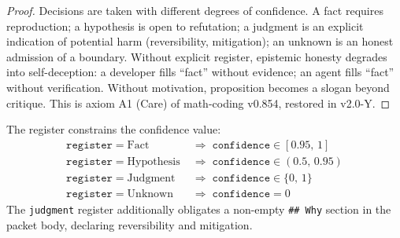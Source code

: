 \begin{proof}
Decisions are taken with different degrees of confidence. A fact
requires reproduction; a hypothesis is open to refutation; a judgment
is an explicit indication of potential harm (reversibility,
mitigation); an unknown is an honest admission of a boundary. Without
explicit register, epistemic honesty degrades into self-deception:
a developer fills ``fact'' without evidence; an agent fills
``fact'' without verification. Without motivation, proposition
becomes a slogan beyond critique. This is axiom A1 (Care) of
math-coding v0.854, restored in v2.0-Y.
\end{proof}

\begin{theorem}
The register constrains the confidence value:
\begin{align*}
\mathtt{register} = \mathrm{Fact}       &\;\Rightarrow\; \mathtt{confidence} \in [0.95,\, 1] \\
\mathtt{register} = \mathrm{Hypothesis} &\;\Rightarrow\; \mathtt{confidence} \in (0.5,\, 0.95) \\
\mathtt{register} = \mathrm{Judgment}   &\;\Rightarrow\; \mathtt{confidence} \in \{0,\, 1\} \\
\mathtt{register} = \mathrm{Unknown}    &\;\Rightarrow\; \mathtt{confidence} = 0
\end{align*}
The \texttt{judgment} register additionally obligates a non-empty
\texttt{\#\# Why} section in the packet body, declaring reversibility
and mitigation.
\end{theorem}